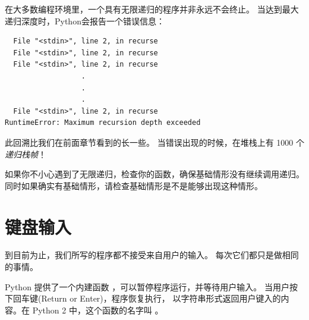 {{{{在大多数编程环境里，一个具有无限递归的程序并非永远不会终止。
当达到最大递归深度时，Python会报告一个错误信息：
  

\begin{lstlisting}
  File "<stdin>", line 2, in recurse
  File "<stdin>", line 2, in recurse
  File "<stdin>", line 2, in recurse
                  .
                  .
                  .
  File "<stdin>", line 2, in recurse
RuntimeError: Maximum recursion depth exceeded
\end{lstlisting}

%

此回溯比我们在前面章节看到的长一些。
当错误出现的时候，在堆栈上有 1000 个{\em 递归栈帧}！


如果你不小心遇到了无限递归，检查你的函数，确保基础情形没有继续调用递归。
同时如果确实有基础情形，请检查基础情形是不是能够出现这种情形。

\section{键盘输入}


到目前为止，我们所写的程序都不接受来自用户的输入。
每次它们都只是做相同的事情。


Python 提供了一个内建函数  ，可以暂停程序运行，并等待用户输入。
当用户按下回车键(Return or Enter)，程序恢复执行， 以字符串形式返回用户键入的内容。在 Python 2 中，这个函数的名字叫  。

}}}}
